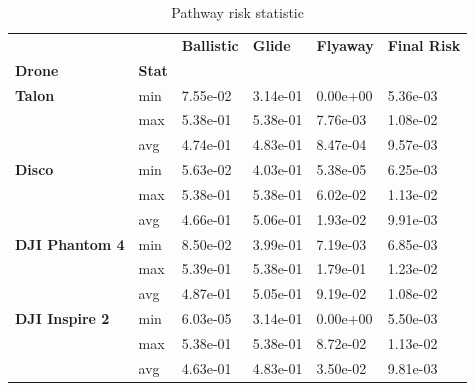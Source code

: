\documentclass[12pt]{report}
\begin{document}
    \begin{table}[H]
        \centering
        \caption{Pathway risk statistic} %
        \begin{tabular}{|l l l l l l |}
            \hline
                  &  & \textbf{Ballistic} & \textbf{Glide} & \textbf{Flyaway} & \textbf{Final Risk} \\
            \textbf{Drone} &\textbf{Stat}  &  &  &  &  \\
            \hline
            \textbf{Talon} & min & 7.55e-02 & 3.14e-01 & 0.00e+00 & 5.36e-03 \\
                           & max & 5.38e-01 & 5.38e-01 & 7.76e-03 & 1.08e-02 \\
                           & avg & 4.74e-01 & 4.83e-01 & 8.47e-04 & 9.57e-03 \\
            \hline
            \textbf{Disco} & min & 5.63e-02 & 4.03e-01 & 5.38e-05 & 6.25e-03 \\
                           & max & 5.38e-01 & 5.38e-01 & 6.02e-02 & 1.13e-02 \\
                           & avg & 4.66e-01 & 5.06e-01 & 1.93e-02 & 9.91e-03 \\
            \hline
            \textbf{DJI Phantom 4} & min & 8.50e-02 & 3.99e-01 & 7.19e-03 & 6.85e-03 \\
                                    & max & 5.39e-01 & 5.38e-01 & 1.79e-01 & 1.23e-02 \\
                                    & avg & 4.87e-01 & 5.05e-01 & 9.19e-02 & 1.08e-02 \\
            \hline
            \textbf{DJI Inspire 2} & min & 6.03e-05 & 3.14e-01 & 0.00e+00 & 5.50e-03 \\
                                    & max & 5.38e-01 & 5.38e-01 & 8.72e-02 & 1.13e-02 \\
                                    & avg & 4.63e-01 & 4.83e-01 & 3.50e-02 & 9.81e-03 \\
            \hline
        \end{tabular}
        \captionsetup{justification=justified} %
        \label{tab:pathway-risk}
    \end{table}
\end{document}
